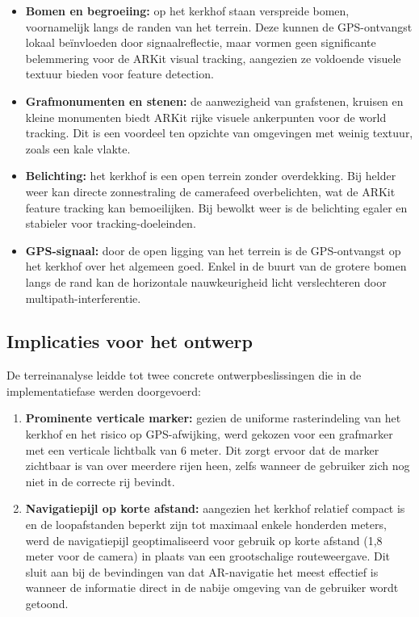 \begin{itemize}
    \item \textbf{Bomen en begroeiing:} op het kerkhof staan verspreide bomen, voornamelijk langs de randen van het terrein. Deze kunnen de GPS-ontvangst lokaal beïnvloeden door signaalreflectie, maar vormen geen significante belemmering voor de ARKit visual tracking, aangezien ze voldoende visuele textuur bieden voor feature detection.
    
    \item \textbf{Grafmonumenten en stenen:} de aanwezigheid van grafstenen, kruisen en kleine monumenten biedt ARKit rijke visuele ankerpunten voor de world tracking. Dit is een voordeel ten opzichte van omgevingen met weinig textuur, zoals een kale vlakte.
    
    \item \textbf{Belichting:} het kerkhof is een open terrein zonder overdekking. Bij helder weer kan directe zonnestraling de camerafeed overbelichten, wat de ARKit feature tracking kan bemoeilijken. Bij bewolkt weer is de belichting egaler en stabieler voor tracking-doeleinden.
    
    \item \textbf{GPS-signaal:} door de open ligging van het terrein is de GPS-ontvangst op het kerkhof over het algemeen goed. Enkel in de buurt van de grotere bomen langs de rand kan de horizontale nauwkeurigheid licht verslechteren door multipath-interferentie.
\end{itemize}

\subsection{Implicaties voor het ontwerp}

De terreinanalyse leidde tot twee concrete ontwerpbeslissingen die in de implementatiefase werden doorgevoerd:

\begin{enumerate}
    \item \textbf{Prominente verticale marker:} gezien de uniforme rasterindeling van het kerkhof en het risico op GPS-afwijking, werd gekozen voor een grafmarker met een verticale lichtbalk van 6 meter. Dit zorgt ervoor dat de marker zichtbaar is van over meerdere rijen heen, zelfs wanneer de gebruiker zich nog niet in de correcte rij bevindt.
    
    \item \textbf{Navigatiepijl op korte afstand:} aangezien het kerkhof relatief compact is en de loopafstanden beperkt zijn tot maximaal enkele honderden meters, werd de navigatiepijl geoptimaliseerd voor gebruik op korte afstand (1,8 meter voor de camera) in plaats van een grootschalige routeweergave. Dit sluit aan bij de bevindingen van \autocite{Zhao2025} dat AR-navigatie het meest effectief is wanneer de informatie direct in de nabije omgeving van de gebruiker wordt getoond.
\end{enumerate}